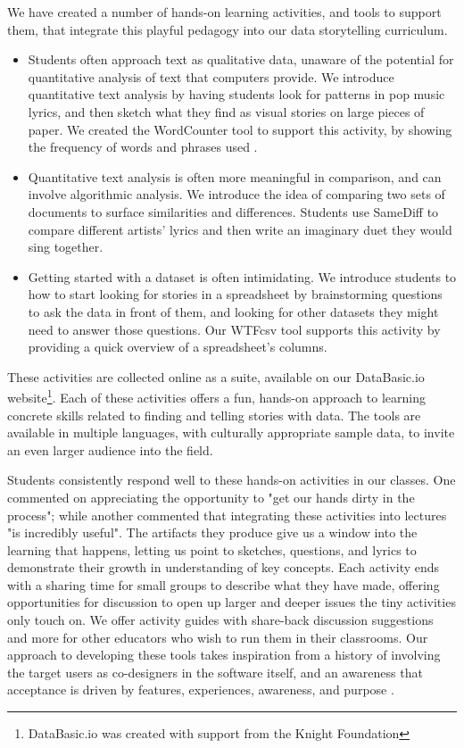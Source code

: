 \documentclass{acm_proc_article-sp}
\begin{document}
We have created a number of hands-on learning activities, and tools to support them, that integrate this playful pedagogy into our data storytelling curriculum. 
\begin{itemize}
  \item Students often approach text as qualitative data, unaware of the potential for quantitative analysis of text that computers provide.  We introduce quantitative text analysis by having students look for patterns in pop music lyrics, and then sketch what they find as visual stories on large pieces of paper.  We created the WordCounter tool to support this activity, by showing the frequency of words and phrases used \cite{bhargava_designing_2015}.
  \item Quantitative text analysis is often more meaningful in comparison, and can involve algorithmic analysis. We introduce the idea of comparing two sets of documents to surface similarities and differences. Students use SameDiff to compare different artists' lyrics and then write an imaginary duet they would sing together. 
  \item Getting started with a dataset is often intimidating. We introduce students to how to start looking for stories in a spreadsheet by brainstorming questions to ask the data in front of them, and looking for other datasets they might need to answer those questions.  Our WTFcsv tool supports this activity by providing a quick overview of a spreadsheet's columns.
\end{itemize}

These activities are collected online as a suite, available on our DataBasic.io website\footnote{DataBasic.io was created with support from the Knight Foundation}. Each of these activities offers a fun, hands-on approach to learning concrete skills related to finding and telling stories with data.  The tools are available in multiple languages, with culturally appropriate sample data, to invite an even larger audience into the field.

Students consistently respond well to these hands-on activities in our classes.  One commented on appreciating the opportunity to "get our hands dirty in the process"; while another commented that integrating these activities into lectures "is incredibly useful".  The artifacts they produce give us a window into the learning that happens, letting us point to sketches, questions, and lyrics to demonstrate their growth in understanding of key concepts.  Each activity ends with a sharing time for small groups to describe what they have made, offering opportunities for discussion to open up larger and deeper issues the tiny activities only touch on.  We offer activity guides with share-back discussion suggestions and more for other educators who wish to run them in their classrooms. Our approach to developing these tools takes inspiration from a history of involving the target users as co-designers in the software itself, and an awareness that acceptance is driven by features, experiences, awareness, and purpose \cite{mackie_factors_1988}.
\end{document}
